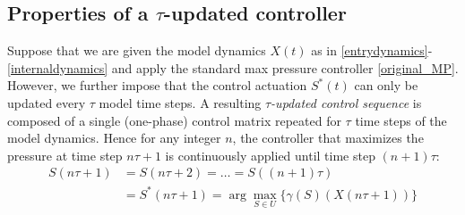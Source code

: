 \subsection*{Properties of a $\tau$-updated controller}
Suppose that we are given the model dynamics $X(t)$ as in \eqref{entrydynamics}-\eqref{internaldynamics} and apply the standard max pressure controller \eqref{original_MP}. However, we further impose that the control actuation $S^*(t)$ can only be updated every $\tau$ model time steps. A resulting \emph{$\tau$-updated control sequence} is composed of a single (one-phase) control matrix repeated for $\tau$ time steps of the model dynamics. Hence for any integer $n$, the controller that maximizes the pressure at time step $n\tau + 1$ is continuously applied until time step $(n + 1)\tau$:
\begin{align}  \label{CYCLE_CONTROLLER}
S(n\tau+1)  &= S(n\tau +2) = \ldots = S((n+1)\tau ) \\ \nonumber
&= S^*(n\tau +1) =  \arg\max_{S\in U} \{\gamma(S)(X(n\tau +1 ))\}  
\end{align}
%
%
%

